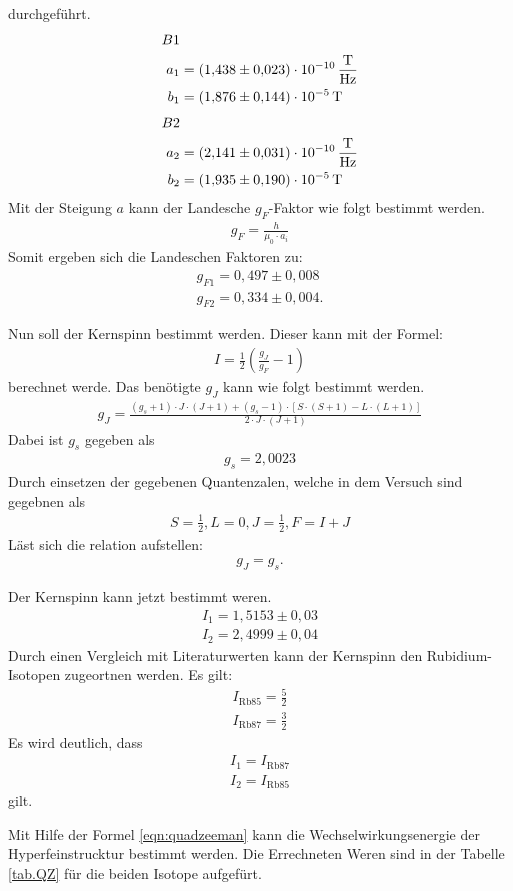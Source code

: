 durchgeführt.
\begin{align*}
  B1&\\
  a_1&=\SI{1.438\pm 0.023e-10}{\frac{T}{Hz}}\\
  b_1&=\SI{1.876\pm 0.144e-5}{T}
\end{align*}
\begin{align*}
  B2&\\
  a_2&=\SI{2.141\pm0.031e-10}{\frac{T}{Hz}}\\
  b_2&=\SI{1.935\pm0.190e-5}{T}
\end{align*}
\FloatBarrier
Mit der Steigung $a$ kann der Landesche $g_F$-Faktor wie folgt bestimmt werden.
\begin{align*}
  g_F = \frac{h}{\mu_0\cdot a_i}
\end{align*}
Somit ergeben sich die Landeschen Faktoren zu:
\begin{align*}
  g_{F1} = 0,497\pm0,008\\
  g_{F2} = 0,334\pm0,004.
\end{align*}

Nun soll der Kernspinn bestimmt werden.
Dieser kann mit der Formel:
\begin{align*}
  I = \frac{1}{2}\left(\frac{g_J}{g_F}-1\right)
\end{align*}
berechnet werde.
Das benötigte $g_J$ kann wie folgt bestimmt werden.
\begin{align*}
  g_J = \frac{(g_s+1)\cdot J\cdot(J+1)+(g_s-1)\cdot[S\cdot (S+1)-L\cdot (L+1)]}{2\cdot J \cdot (J+1)}
\end{align*}
Dabei ist $g_s$ gegeben als
\begin{align*}
  g_s = 2,0023
\end{align*}
Durch einsetzen der gegebenen Quantenzalen, welche in dem Versuch sind gegebnen als
\begin{align*}
  S = \frac{1}{2}, L=0, J=\frac{1}{2}, F = I+J
\end{align*}
Läst sich die relation aufstellen:
\begin{align*}
  g_J=g_s.
\end{align*}

Der Kernspinn kann jetzt bestimmt weren.
\begin{align*}
  I_1=1,5153\pm0,03\\
  I_2=2,4999\pm0,04
\end{align*}
Durch einen Vergleich mit Literaturwerten kann der Kernspinn den Rubidium-Isotopen zugeortnen werden.
Es gilt:
\begin{align*}
  I_{\text{Rb85}}=\frac{5}{2}\\
  I_{\text{Rb87}}=\frac{3}{2}
\end{align*}
Es wird deutlich, dass
\begin{align*}
  I_1=I_{\text{Rb87}}\\
  I_2=I_{\text{Rb85}}
\end{align*}
gilt.

Mit Hilfe der Formel \ref{eqn:quadzeeman} kann die Wechselwirkungsenergie der Hyperfeinstrucktur bestimmt werden.
Die Errechneten Weren sind in der Tabelle \ref{tab.QZ} für die beiden Isotope aufgefürt.

